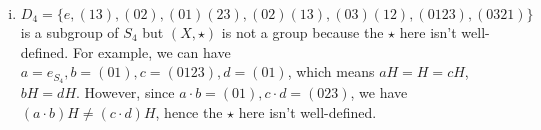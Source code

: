 \documentclass{article}[12pt]
\begin{document}
\begin{enumerate}[(i)]
\begin{itemize}
\item For $a,b,c\in G$, $((a H) \star(b H))\star (cH)=((a \cdot b) H)\star (cH)=((a \cdot b)\cdot c) H=(a \cdot (b\cdot c)) H=(aH)\star ((b\cdot c)H)=(aH)\star ((bH)\star (cH))$.
\item $(eH)$ is the identity element in $X$, where $e$ is the identity element $e\in G$. It is followed from $(a H) \star(e H)=(e H) \star(a H)=(a \cdot e) H=(e \cdot a) H=aH$.
\item For $a\in G$, $a^{-1}\in G$, therefore, for $aH\in X$, we can find $a^{-1}H\in X$ such that $(aH)\star (a^{-1}H)=(a^{-1}H)\star(aH)=eH$.
\end{itemize}
\item 
$D_4=\{e,(13),(02),(01)(23),(02)(13),(03)(12),(0123),(0321)\}$ is a subgroup of $S_4$ but $(X,\star)$ is not a group because the $\star$ here isn't well-defined. For example, we can have $a=e_{S_4},b=(01),c=(0123),d=(01)$, which means $aH=H=cH$, $bH=dH$. However, since $a\cdot b=(01),
c\cdot d=(023)$, we have $(a \cdot b) H\not=(c \cdot d) H$, hence
the $\star$ here isn't well-defined.
\end{enumerate}
\end{document}

